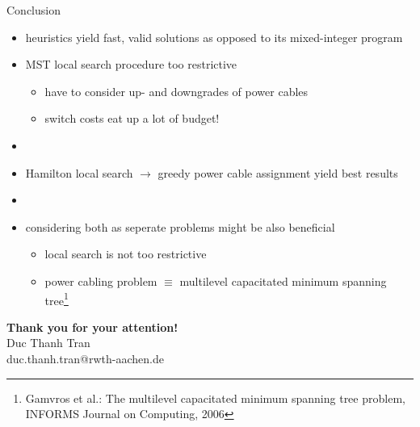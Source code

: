 \begin{frame}{Conclusion}
\vfill
\begin{itemize}
  \item heuristics yield fast, valid solutions as opposed to its mixed-integer program
  \item MST local search procedure too restrictive
  \begin{itemize}
    \item have to consider up- and downgrades of power cables
    \item switch costs eat up a lot of budget!
  \end{itemize}
  \item[]
  \item Hamilton local search $\to$ greedy power cable assignment yield best results
  \item[]
  \item considering both as seperate problems might be also beneficial
  \begin{itemize}
    \item local search is not too restrictive
    \item power cabling problem $\equiv$ multilevel capacitated minimum spanning tree\footnote{Gamvros et al.: The multilevel capacitated minimum spanning tree problem, INFORMS Journal on Computing, 2006}
  \end{itemize}
\end{itemize}
\vfill
\end{frame}

\begin{frame}
\centering
\vfill
\textbf{\Large Thank you for your attention!} \\
\vspace*{1cm}
{\small Duc Thanh Tran} \\
duc.thanh.tran@rwth-aachen.de
\vfill
\end{frame}